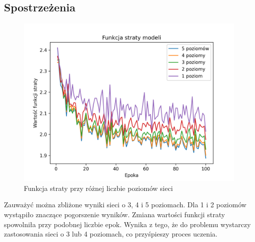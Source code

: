 \documentclass[a4paper,11pt]{article}
\begin{document}
\subsection{Spostrzeżenia}
\begin{figure}[h!]
\begin{center}
	\includegraphics[width=0.7\columnwidth]{layers.png}
	\caption{Funkcja straty przy różnej liczbie poziomów sieci}
\end{center}
\end{figure}
Zauważyć można zbliżone wyniki sieci o 3, 4 i 5 poziomach.
Dla 1 i 2 poziomów wystąpiło znaczące pogorszenie wyników. Zmiana wartości funkcji straty spowolniła przy podobnej liczbie epok.
Wynika z tego, że do problemu wystarczy zastosowania sieci o 3 lub 4 poziomach, co przyśpieszy proces uczenia.
\end{document}
